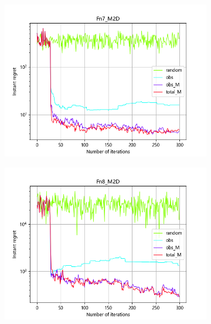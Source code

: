 \documentclass{article}
\begin{document}
\begin{figure}[H]
\begin{subfigure}[t]{.32\linewidth}
        \includegraphics[width=1\textwidth]{pictures/Homo_noise_2D_onlyEI/Fn7_M2D_ins.png}
    \end{subfigure}
    \begin{subfigure}[t]{.32\linewidth}
        \centering
        \includegraphics[width=1\textwidth]{pictures/Homo_noise_2D_onlyEI/Fn8_M2D_ins.png}
    \end{subfigure}
    \begin{subfigure}[t]{.32\linewidth}
        \centering

\end{subfigure}
\end{figure}
\end{document}
